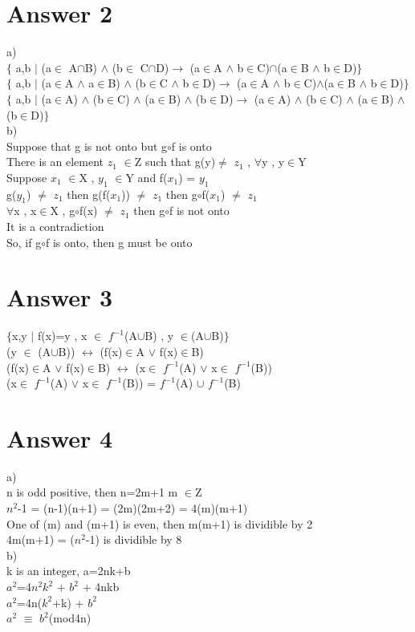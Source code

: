 \documentclass[12pt]{article}
\begin{document}
\section*{Answer 2}
a) \\
$\lbrace$ a,b $\vert$ (a$\in$ A$\cap$B) $\wedge$ (b$\in$ C$\cap$D)$\rightarrow$ (a$\in$A $\wedge$ b$\in$C)$\cap$(a$\in$B $\wedge$ b$\in$D)$\rbrace$ \\
$\lbrace$ a,b $\vert$ (a$\in$A $\wedge$ a$\in$B) $\wedge$ (b$\in$C $\wedge$ b$\in$D)$\rightarrow$ (a$\in$A $\wedge$ b$\in$C)$\wedge$(a$\in$B $\wedge$ b$\in$D)$\rbrace$ \\
$\lbrace$ a,b $\vert$ (a$\in$A) $\wedge$ (b$\in$C) $\wedge$ (a$\in$B) $\wedge$ (b$\in$D)$\rightarrow$ (a$\in$A) $\wedge$ (b$\in$C) $\wedge$ (a$\in$B) $\wedge$ (b$\in$D)$\rbrace$ \\
b) \\
Suppose that g is not onto but g$\circ$f is onto \\
There is an element  $z_{1}$ $\in$Z such that g(y)$\neq$ $z_{1}$ , $\forall$y , y$\in$Y \\
Suppose $x_{1}$ $\in$X , $y_{1}$ $\in$Y and f($x_{1}$) = $y_{1}$ \\
g($y_{1}$) $\neq$ $z_{1}$ then g(f($x_{1}$)) $\neq$ $z_{1}$ then g$\circ$f($x_{1}$) $\neq$ $z_{1}$ \\
$\forall$x , x$\in$X , g$\circ$f(x) $\neq$ $z_{1}$ then g$\circ$f is not onto \\
It is a contradiction \\
So, if g$\circ$f is onto, then g must be onto \\
\section*{Answer 3}
$\lbrace$x,y $\vert$ f(x)=y , x $\in$ $f^{-1}$(A$\cup$B) , y $\in$(A$\cup$B)$\rbrace$ \\
(y $\in$ (A$\cup$B)) $\leftrightarrow$ (f(x)$\in$A $\vee$ f(x)$\in$B) \\
(f(x)$\in$A $\vee$ f(x)$\in$B) $\leftrightarrow$ (x$\in$ $f^{-1}$(A) $\vee$  x$\in$ $f^{-1}$(B)) \\
(x$\in$ $f^{-1}$(A) $\vee$  x$\in$ $f^{-1}$(B)) = $f^{-1}$(A) $\cup$ $f^{-1}$(B) \\
\section*{Answer 4}
a) \\
n is odd positive, then n=2m+1 m $\in$Z \\
$n^{2}$-1 = (n-1)(n+1) = (2m)(2m+2) = 4(m)(m+1) \\
One of (m) and (m+1) is even, then m(m+1) is dividible by 2 \\ 
4m(m+1) = ($n^{2}$-1) is dividible by 8 \\
b) \\
k is an integer, a=2nk+b \\
$a^{2}$=4$n^{2}$$k^{2}$ + $b^{2}$ + 4nkb \\
$a^{2}$=4n($k^{2}$+k) + $b^{2}$ \\
$a^{2}$ $\equiv$ $b^{2}$(mod4n) \\
\end{document}
